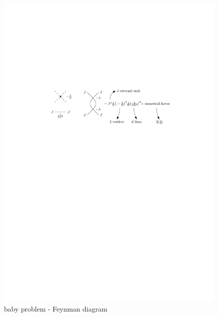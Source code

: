 \begin{itemize}
	\begin{figure}[H]
		\centering
		\includegraphics[scale=1]{figures/a baby problem - Feynman diagram.pdf}
		\caption{baby problem - Feynman diagram}
	\end{figure}
	

\end{itemize}
